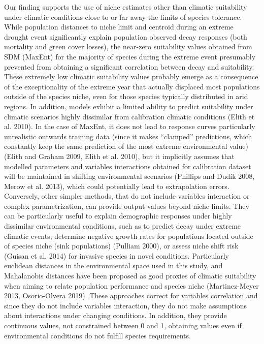 \documentclass[11pt,twoside]{reedthesis}
\begin{document}
Our finding supports the use of niche estimates other than climatic
suitability under climatic conditions close to or far away the limits of
species tolerance. While population distances to niche limit and
centroid during an extreme drought event significantly explain
population observed decay responses (both mortality and green cover
losses), the near-zero suitability values obtained from SDM (MaxEnt) for
the majority of species during the extreme event presumably prevented
from obtaining a significant correlation between decay and suitability.
These extremely low climatic suitability values probably emerge as a
consequence of the exceptionality of the extreme year that actually
displaced most populations outside of the species niche, even for those
species typically distributed in arid regions. In addition, models
exhibit a limited ability to predict suitability under climatic
scenarios highly dissimilar from calibration climatic conditions (Elith
et al. 2010). In the case of MaxEnt, it does not lead to response curves
particularly unrealistic outwards training data (since it makes
``clamped'' predictions, which constantly keep the same prediction of
the most extreme environmental value) (Elith and Graham 2009, Elith et
al. 2010), but it implicitly assumes that modelled parameters and
variables interactions obtained for calibration dataset will be
maintained in shifting environmental scenarios (Phillips and Dudík 2008,
Merow et al. 2013), which could potentially lead to extrapolation
errors. Conversely, other simpler methods, that do not include variables
interaction or complex parametrization, can provide output values beyond
niche limits. They can be particularly useful to explain demographic
responses under highly dissimilar environmental conditions, such as to
predict decay under extreme climatic events, determine negative growth
rates for populations located outside of species niche (sink
populations) (Pulliam 2000), or assess niche shift risk (Guisan et al.
2014) for invasive species in novel conditions. Particularly euclidean
distances in the environmental space used in this study, and Mahalanobis
distances have been proposed as good proxies of climatic suitability
when aiming to relate population performance and species niche
(Martinez-Meyer 2013, Osorio-Olvera 2019). These approaches correct for
variables correlation and since they do not include variables
interaction, they do not make assumptions about interactions under
changing conditions. In addition, they provide continuous values, not
constrained between 0 and 1, obtaining values even if environmental
conditions do not fulfill species requirements.\par
\end{document}

